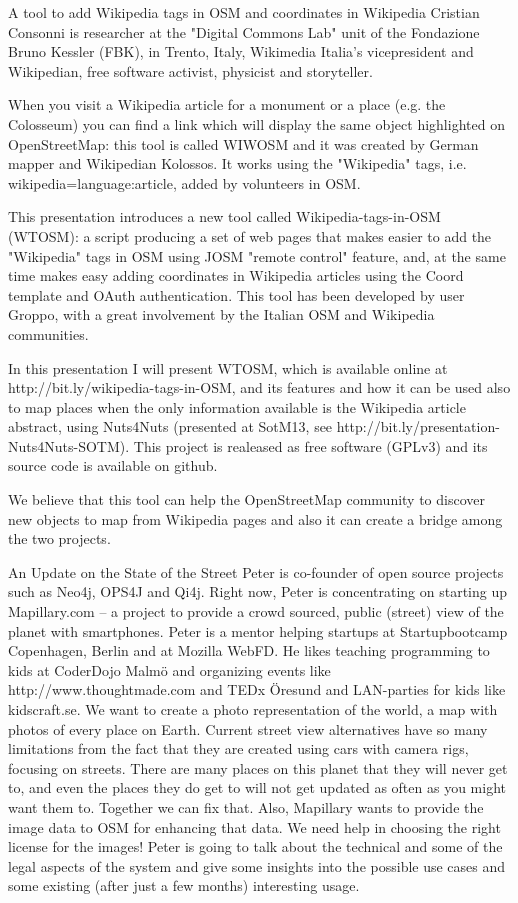 %
{A tool to add Wikipedia tags in OSM and coordinates in Wikipedia}%
{Cristian Consonni is researcher at the "Digital Commons Lab" unit of the Fondazione Bruno Kessler (FBK), in Trento, Italy, Wikimedia Italia's vicepresident and Wikipedian, free software activist, physicist and storyteller.}%
{When you visit a Wikipedia article for a monument or a place (e.g. the Colosseum) you can find a link which will display the same object highlighted on OpenStreetMap: this tool is called WIWOSM and it was created by German mapper and Wikipedian Kolossos. It works using the "Wikipedia" tags, i.e. wikipedia=language:article, added by volunteers
in OSM.

This presentation introduces a new tool called Wikipedia-tags-in-OSM (WTOSM): a script producing a set of web pages that makes easier to add the "Wikipedia" tags in OSM using JOSM "remote control" feature, and, at the same time makes easy adding coordinates in Wikipedia articles using the {{Coord}} template and OAuth authentication. This tool has been developed by user Groppo, with a great involvement by
the Italian OSM and Wikipedia communities.

In this presentation I will present WTOSM, which is available online at http://bit.ly/wikipedia-tags-in-OSM, and its features and how it
can be used also to map places when the only information available is the Wikipedia article abstract, using Nuts4Nuts (presented at SotM13,
see http://bit.ly/presentation-Nuts4Nuts-SOTM). This project is realeased as free software (GPLv3) and its source code is available on
github.

We believe that this tool can help the OpenStreetMap community to discover new objects to map from Wikipedia pages and also it can
create a bridge among the two projects.}


%
{An Update on the State of the Street}%
{Peter is co-founder of open source projects such as Neo4j, OPS4J and Qi4j. Right now, Peter is concentrating on starting up Mapillary.com -- a project to provide a crowd sourced, public (street) view of the planet with smartphones. Peter is a mentor helping startups at Startupbootcamp Copenhagen, Berlin and at Mozilla WebFD. He likes teaching programming to kids at CoderDojo Malmö and organizing events like http://www.thoughtmade.com and TEDx Öresund and LAN-parties for kids like kidscraft.se.}%
{We want to create a photo representation of the world, a map with photos of every place on Earth. Current street view alternatives have so many limitations from the fact that they are created using cars with camera rigs, focusing on streets. There are many places on this planet that they will never get to, and even the places they do get to will not get updated as often as you might want them to. Together we can fix that. Also, Mapillary wants to provide the image data to OSM for enhancing that data. We need help in choosing the right license for the images! Peter is going to talk about the technical and some of the legal aspects of the system and give some insights into the possible use cases and some existing (after just a few months) interesting usage.}

